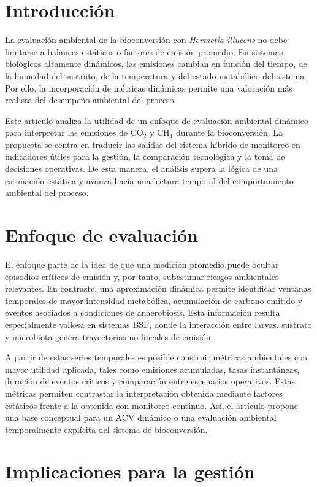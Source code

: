 \section{Introducción}

La evaluación ambiental de la bioconversión con \textit{Hermetia illucens} no debe limitarse a balances estáticos o factores de emisión promedio. En sistemas biológicos altamente dinámicos, las emisiones cambian en función del tiempo, de la humedad del sustrato, de la temperatura y del estado metabólico del sistema. Por ello, la incorporación de métricas dinámicas permite una valoración más realista del desempeño ambiental del proceso.

Este artículo analiza la utilidad de un enfoque de evaluación ambiental dinámico para interpretar las emisiones de CO$_2$ y CH$_4$ durante la bioconversión. La propuesta se centra en traducir las salidas del sistema híbrido de monitoreo en indicadores útiles para la gestión, la comparación tecnológica y la toma de decisiones operativas. De esta manera, el análisis supera la lógica de una estimación estática y avanza hacia una lectura temporal del comportamiento ambiental del proceso.

\section{Enfoque de evaluación}

El enfoque parte de la idea de que una medición promedio puede ocultar episodios críticos de emisión y, por tanto, subestimar riesgos ambientales relevantes. En contraste, una aproximación dinámica permite identificar ventanas temporales de mayor intensidad metabólica, acumulación de carbono emitido y eventos asociados a condiciones de anaerobiosis. Esta información resulta especialmente valiosa en sistemas BSF, donde la interacción entre larvas, sustrato y microbiota genera trayectorias no lineales de emisión.

A partir de estas series temporales es posible construir métricas ambientales con mayor utilidad aplicada, tales como emisiones acumuladas, tasas instantáneas, duración de eventos críticos y comparación entre escenarios operativos. Estas métricas permiten contrastar la interpretación obtenida mediante factores estáticos frente a la obtenida con monitoreo continuo. Así, el artículo propone una base conceptual para un ACV dinámico o una evaluación ambiental temporalmente explícita del sistema de bioconversión.

\section{Implicaciones para la gestión}

